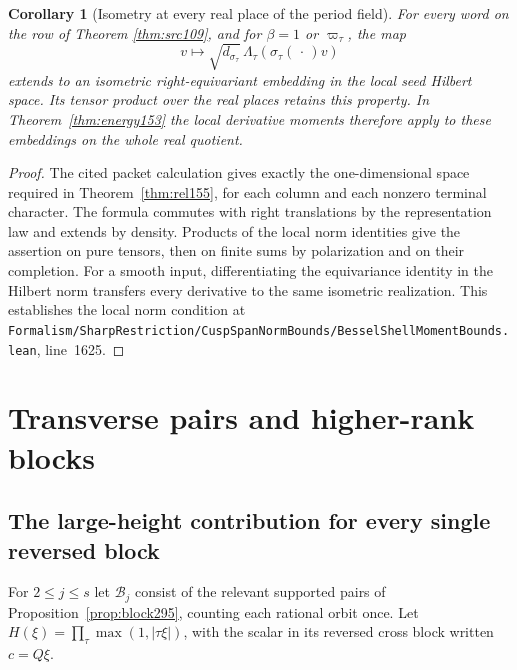 \documentclass[a4paper,11pt]{article}
\newtheorem{corollary}[proposition]{Corollary}
\theoremstyle{definition}
\theoremstyle{remark}
\newcommand{\srcloc}[2]{{\small\nolinkurl{#1.lean}}, line~#2}
\numberwithin{equation}{section}
\begin{document}
\begin{corollary}[Isometry at every real place of the period field]
\label{cor:rel155}
For every word on the row of
Theorem \ref{thm:src109},
and for \(\beta=1\) or \(\varpi_\tau\), the map
\[
        v\longmapsto \sqrt{d_{\sigma_\tau}}\,
            \Lambda_\tau(\sigma_\tau(\,\cdot\,)v)
\]
extends to an isometric right-equivariant embedding in the local
seed Hilbert space. Its tensor product over the real places
retains this property. In Theorem~\ref{thm:energy153} the
local derivative moments therefore apply to these embeddings
on the whole real quotient.
\end{corollary}
\begin{proof}
The cited packet calculation gives exactly the one-dimensional
space required in Theorem~\ref{thm:rel155}, for each column
and each nonzero terminal character. The formula commutes with
right translations by the representation law and extends by
density. Products of the local norm identities give the assertion
on pure tensors, then on finite sums by polarization and on their
completion. For a smooth input, differentiating the equivariance
identity in the Hilbert norm transfers every derivative to the
same isometric realization. This establishes the local norm
condition at
\srcloc{Formalism/SharpRestriction/CuspSpanNormBounds/BesselShellMomentBounds}{1625}.
\end{proof}

\section{Transverse pairs and higher-rank blocks}\label{nav:g-X-3}

\subsection{The large-height contribution for every single reversed block}\label{nav:I-70}
For \(2\le j\le s\) let \(\mathcal B_j\) consist of the
relevant supported pairs of Proposition~\ref{prop:block295},
counting each rational orbit once. Let
\(H(\xi)=\prod_\tau\max(1,|\tau\xi|)\), with the scalar
in its reversed cross block written \(c=Q\xi\).
\end{document}

